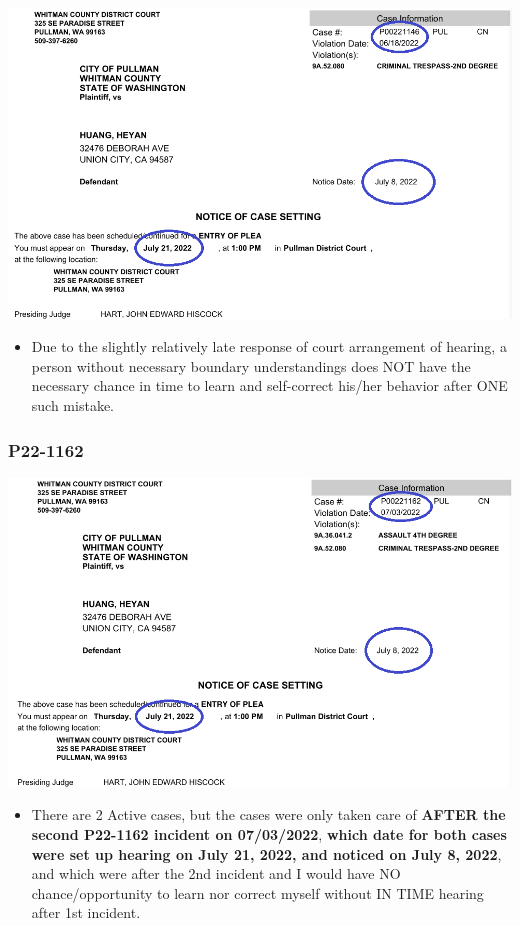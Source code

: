 \documentclass[9pt, b5paper]{article}
\begin{document}
\includegraphics[width=.9\linewidth]{./pic/dearCousin_20220919_185022.png}
\begin{itemize}
\item Due to the slightly relatively late response of court arrangement of hearing, a person without necessary boundary understandings does NOT have the necessary chance in time to learn and self-correct his/her behavior after ONE such mistake.
\end{itemize}
\subsubsection{\textbf{P22-1162}}
\label{sec-2-1-2}

\includegraphics[width=.9\linewidth]{./pic/dearCousin_20220919_185057.png}
\begin{itemize}
\item There are 2 Active cases, but the cases were only taken care of \textbf{AFTER the second P22-1162 incident on 07/03/2022}, \textbf{which date for both cases were set up hearing on July 21, 2022, and noticed on July 8, 2022}, and which were after the 2nd incident and I would have NO chance/opportunity to learn nor correct myself without IN TIME hearing after 1st incident.
\end{itemize}
\end{document}
